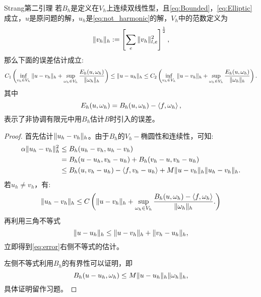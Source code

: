 \begin{theorem}{Strang第二引理}
    若$B_{h}$是定义在$V_{h}$上连续双线性型，且\eqref{eq:Bounded}，\eqref{eq:Elliptic}成立，$u$是原问题的解，$u_{h}$是\eqref{eq:not_harmonic}的解，$V_{h}$中的范数定义为
    \begin{equation}
        \|v_{h}\|_{h}:=\left[\sum_{e}\|v_{h}\|_{l,e}^{2}\right]^{\frac{1}{2}},
    \end{equation}
    那么下面的误差估计成立:
    \begin{equation}
        \label{eq:error}
        C_{1}\left(\inf_{v_{h}\in V_{h}}\|u-v_{h}\|_{h}+\sup_{\omega_{h}\in V_{h}}\frac{E_{h}(u,\omega_{h})}{\|\omega_{h}\|_{h}}\right)\le\|u-u_{h}\|_{h}\le C_{2}\left(\inf_{v_{h}\in V_{h}}\|u-v_{h}\|_{h}+\sup_{\omega_{h}\in V_{h}}\frac{E_{h}(u,\omega_{h})}{\|\omega_{h}\|_{h}}\right).
    \end{equation}
    其中
    \begin{equation}
        E_{h}(u,\omega_{h})=B_{h}(u,\omega_{h})-\left<f,\omega_{h}\right>,
    \end{equation}
    表示了非协调有限元中用$B_{h}$估计$B$时引入的误差。
\end{theorem}
\begin{proof}
    首先估计$\|u_{h}-v_{h}\|_{h}$。由于$B_{h}$的$V_{h}-$椭圆性和连续性，可知:
    \begin{equation}
        \begin{aligned}
            \alpha\|u_{h}-v_{h}\|_{h}^{2}&\le B_{h}(u_{h}-v_{h},u_{h}-v_{h})\\
            &=B_{h}(u-u_{h},v_{h}-u_{h})+B_{h}(v_{h}-u,v_{h}-u_{h})\\
            &\le B_{h}(u,v_{h}-u_{h})-\left<f,v_{h}-u_{h}\right>+M\|u-v_{h}\|_{h}\|u_{h}-v_{h}\|_{h}.
        \end{aligned}
    \end{equation}
    若$u_{h}\neq v_{h}$，有:
    \begin{equation}
        \|u_{h}-v_{h}\|_{h}\le C\left(\|u-v_{h}\|_{h}+\sup_{\omega_{h}\in V_{h}}\frac{B_{h}(u,\omega_{h})-\left<f,\omega_{h}\right>}{\|\omega_{h}\|_{h}}.\right)
    \end{equation}
    再利用三角不等式
    \begin{equation}
        \|u-u_{h}\|_{h}\le\|u-v_{h}\|_{h}+\|v_{h}-u_{h}\|_{h},
    \end{equation}
    立即得到\eqref{eq:error}右侧不等式的估计。

    左侧不等式利用$B_{h}$的有界性可以证明，即
    \begin{equation}
        B_{h}(u-u_{h},\omega_{h})\le M\|u-u_{h}\|_{h}\|\omega_{h}\|_{h},
    \end{equation}
    具体证明留作习题。
\end{proof}
